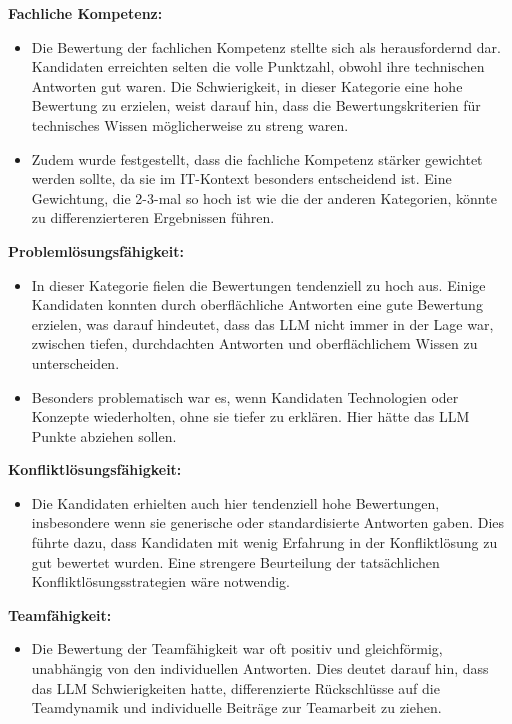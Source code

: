 \textbf{Fachliche Kompetenz:}

\begin{itemize}
    \item Die Bewertung der fachlichen Kompetenz stellte sich als herausfordernd dar. Kandidaten erreichten selten die volle Punktzahl, obwohl ihre technischen Antworten gut waren. Die Schwierigkeit, in dieser Kategorie eine hohe Bewertung zu erzielen, weist darauf hin, dass die Bewertungskriterien für technisches Wissen möglicherweise zu streng waren.
    \item Zudem wurde festgestellt, dass die fachliche Kompetenz stärker gewichtet werden sollte, da sie im IT-Kontext besonders entscheidend ist. Eine Gewichtung, die 2-3-mal so hoch ist wie die der anderen Kategorien, könnte zu differenzierteren Ergebnissen führen.
\end{itemize}

\textbf{Problemlösungsfähigkeit:}

\begin{itemize}
    \item In dieser Kategorie fielen die Bewertungen tendenziell zu hoch aus. Einige Kandidaten konnten durch oberflächliche Antworten eine gute Bewertung erzielen, was darauf hindeutet, dass das \ac{LLM} nicht immer in der Lage war, zwischen tiefen, durchdachten Antworten und oberflächlichem Wissen zu unterscheiden.
    \item Besonders problematisch war es, wenn Kandidaten Technologien oder Konzepte wiederholten, ohne sie tiefer zu erklären. Hier hätte das \ac{LLM} Punkte abziehen sollen.
\end{itemize}

\textbf{Konfliktlösungsfähigkeit:}

\begin{itemize}
    \item Die Kandidaten erhielten auch hier tendenziell hohe Bewertungen, insbesondere wenn sie generische oder standardisierte Antworten gaben. Dies führte dazu, dass Kandidaten mit wenig Erfahrung in der Konfliktlösung zu gut bewertet wurden. Eine strengere Beurteilung der tatsächlichen Konfliktlösungsstrategien wäre notwendig.
\end{itemize}

\textbf{Teamfähigkeit:}

\begin{itemize}
    \item Die Bewertung der Teamfähigkeit war oft positiv und gleichförmig, unabhängig von den individuellen Antworten. Dies deutet darauf hin, dass das \ac{LLM} Schwierigkeiten hatte, differenzierte Rückschlüsse auf die Teamdynamik und individuelle Beiträge zur Teamarbeit zu ziehen.
\end{itemize}

